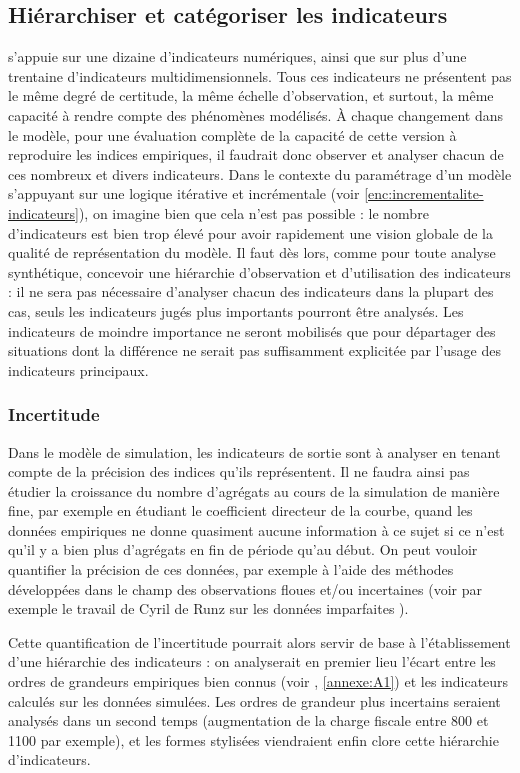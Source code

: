 \subsection{Hiérarchiser et catégoriser les indicateurs \label{subsec:hierarchiser-indicateurs}}
\simfeodal{} s'appuie sur une dizaine d'indicateurs numériques, ainsi que sur plus d'une trentaine d'indicateurs multidimensionnels.
Tous ces indicateurs ne présentent pas le même degré de certitude, la même échelle d'observation, et surtout, la même capacité à rendre compte des phénomènes modélisés.
À chaque changement dans le modèle, pour une évaluation complète de la capacité de cette version à reproduire les indices empiriques, il faudrait donc observer et analyser chacun de ces nombreux et divers indicateurs.
Dans le contexte du paramétrage d'un modèle s'appuyant sur une logique itérative et incrémentale (voir \cref{enc:incrementalite-indicateurs}), on imagine bien que cela n'est pas possible :
le nombre d'indicateurs est bien trop élevé pour avoir rapidement une vision globale de la qualité de représentation du modèle.
Il faut dès lors, comme pour toute analyse synthétique, concevoir une hiérarchie d'observation et d'utilisation des indicateurs :
il ne sera pas nécessaire d'analyser chacun des indicateurs dans la plupart des cas, seuls les indicateurs jugés plus importants pourront être analysés.
Les indicateurs de moindre importance ne seront mobilisés que pour départager des situations dont la différence ne serait pas suffisamment explicitée par l'usage des indicateurs principaux.

\subsubsection{Incertitude}\label{sssec:incertitude}
Dans le modèle de simulation, les indicateurs de sortie sont à analyser en tenant compte de la précision des indices qu'ils représentent.
Il ne faudra ainsi pas étudier la croissance du nombre d'agrégats au cours de la simulation de manière fine, par exemple en étudiant le coefficient directeur de la courbe, quand les données empiriques ne donne quasiment aucune information à ce sujet si ce n'est qu'il y a bien plus d'agrégats en fin de période qu'au début.
On peut vouloir quantifier la précision de ces données, par exemple à l'aide des méthodes développées dans le champ des observations floues et/ou incertaines (voir par exemple le travail de Cyril de Runz sur les données \og imparfaites\fg{} \autocite{de2008imperfection}).

Cette quantification de l'incertitude pourrait alors servir de base à l'établissement d'une hiérarchie des indicateurs :
on analyserait en premier lieu l'écart entre les ordres de grandeurs empiriques bien connus (voir , \cref{annexe:A1}) et les indicateurs calculés sur les données simulées.
Les ordres de grandeur plus incertains seraient analysés dans un second temps (augmentation de la charge fiscale entre 800 et 1100 par exemple), et les formes stylisées viendraient enfin clore cette hiérarchie d'indicateurs.

